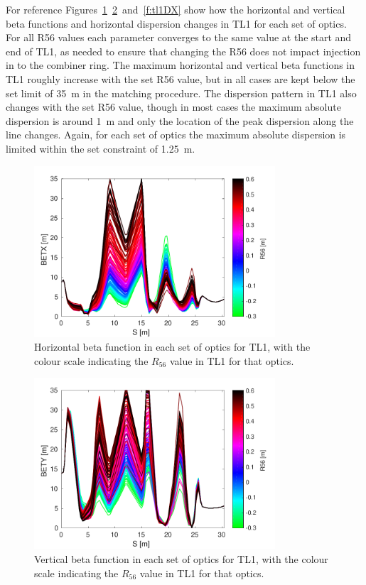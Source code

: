 For reference Figures~\ref{f:tl1BETX}~\ref{f:tl1BETY}~and~\ref{f:tl1DX} show how the horizontal and vertical beta functions and horizontal dispersion changes in TL1 for each set of optics. For all R56 values each parameter converges to the same value at the start and end of TL1, as needed to ensure that changing the R56 does not impact injection in to the combiner ring. The maximum horizontal and vertical beta functions in TL1 roughly increase with the set R56 value, but in all cases are kept below the set limit of 35~m in the matching procedure. The dispersion pattern in TL1 also changes with the set R56 value, though in most cases the maximum absolute dispersion is around 1~m and only the location of the peak dispersion along the line changes. Again, for each set of optics the maximum absolute dispersion is limited within the set constraint of 1.25~m. 

\begin{figure}
  \centering
  \includegraphics[width=0.8\textwidth]{Figures/propagation/BETX}
  \caption{Horizontal beta function in each set of optics for TL1, with the colour scale indicating the \(R_{56}\) value in TL1 for that optics.}
  \label{f:tl1BETX}
\end{figure}

\begin{figure}
  \centering
  \includegraphics[width=0.8\textwidth]{Figures/propagation/BETY}
  \caption{Vertical beta function in each set of optics for TL1, with the colour scale indicating the \(R_{56}\) value in TL1 for that optics.}
  \label{f:tl1BETY}
\end{figure}

